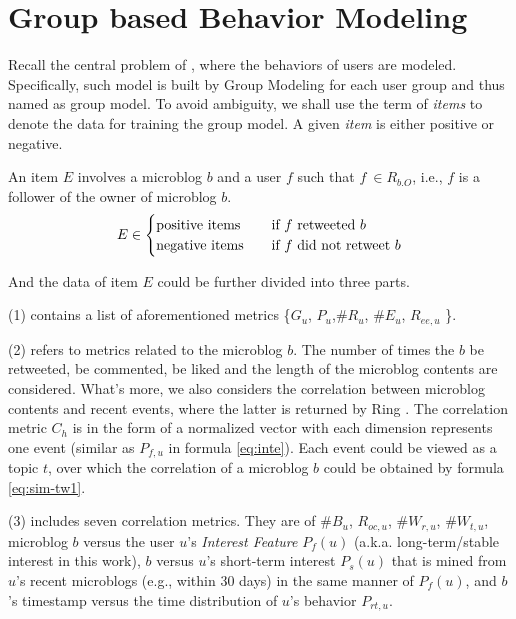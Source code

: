 \section{Group based Behavior Modeling}
\label{sec:gm}



Recall the central problem of \sys{}, where the \retg{} behaviors of users are modeled.
Specifically, such model is built by Group Modeling for each user group and thus named as group model.
To avoid ambiguity, we shall use the term of \textit{items} to denote the data for training the group model.
A given \textit{item} is either positive or negative.

\begin{definition}
\label{def:gm-it}
An item $E$ involves a microblog $b$ and a user $f$ such that $f\ \in R_{b.O}$, i.e., $f$ is a follower of  the owner of microblog $b$.
\begin{equation}
\label{eq:gm-it}
E \in
  \begin{cases}
    \text{positive items}       & \quad \text{if } f \text{ retweeted{} } b\\
    \text{negative items}  		& \quad \text{if } f \text{ did not retweet{} } b
  \end{cases}
\end{equation}
\end{definition}

And the data of item $E$ could be further divided into three parts.

	\stab(1)  contains a list of aforementioned metrics \{$G_u$, $P_u$,\#$R_u$, \#$E_u$, $R_{ee,u}$ \}.
	
	\stab(2)  refers to metrics related to the microblog $b$. The number of times the $b$ be retweeted, be commented, be liked and the length of the microblog contents are considered. What's more, we also considers the correlation between microblog contents and recent events, where the latter is returned by Ring \cite{IEEEexample:ring}. The correlation metric $C_h$ is in the form of a normalized vector with each dimension represents one event (similar as $P_{f,u}$ in formula \ref{eq:inte}). Each event could be viewed as a topic $t$, over which the correlation of a microblog $b$ could be obtained by formula \ref{eq:sim-tw1}.

	\stab(3)  includes seven correlation metrics. They are of \#$B_u$, $R_{oc,u}$, \#$W_{r,u}$, \#$W_{t,u}$, microblog $b$ versus the user $u$'s \textit{Interest Feature} $P_f(u)$ (a.k.a. long-term/stable interest in this work), $b$ versus $u$'s short-term interest $P_s(u)$ that is mined from $u$'s recent microblogs (e.g., within 30 days) in the same manner of $P_f(u)$, and $b$'s timestamp versus the time distribution of $u$'s \retg{} behavior $P_{rt,u}$.

